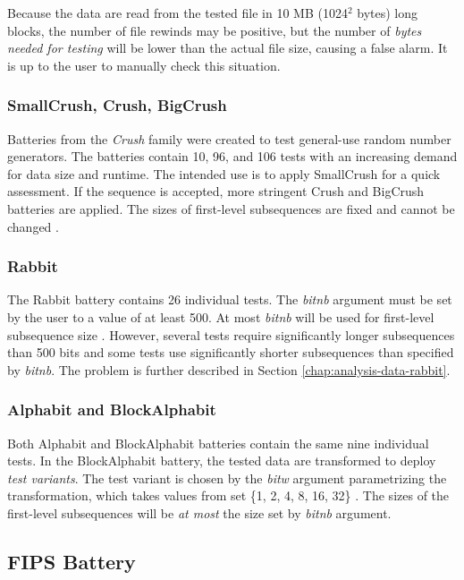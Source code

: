 \documentclass[
  digital,     %
  oneside,     %
  nosansbold,  %
  nocolorbold, %
  nolof,         %
  nolot,         %
]{fithesis4}
\begin{document}
Because the data are read from the tested file in 10 MB (1024$^2$ bytes) long blocks, the number of file rewinds may be positive, but the number of \emph{bytes needed for testing} will be lower than the actual file size, causing a false alarm. It is up to the user to manually check this situation. 


\subsubsection{SmallCrush, Crush, BigCrush}
Batteries from the \emph{Crush} family were created to test general-use random number generators. The batteries contain 10, 96, and 106 tests with an increasing demand for data size and runtime. The intended use is to apply SmallCrush for a quick assessment. If the sequence is accepted, more stringent Crush and BigCrush batteries are applied. The sizes of first-level subsequences are fixed and cannot be changed \cite[p. 242]{tu01_guide}.

\subsubsection{Rabbit}
The Rabbit battery contains 26 individual tests. The \emph{bit\textunderscore nb} argument must be set by the user to a value of at least 500. At most \emph{bit\textunderscore nb} will be used for first-level subsequence size \cite[p. 152]{tu01_guide}. However, several tests require significantly longer subsequences than 500 bits and some tests use significantly shorter subsequences than specified by \emph{bit\textunderscore nb}. The problem is further described in Section \ref{chap:analysis-data-rabbit}.

\subsubsection{Alphabit and BlockAlphabit}
Both Alphabit and BlockAlphabit batteries contain the same nine individual tests. In the BlockAlphabit battery, the tested data are transformed to deploy \emph{test variants}. The test variant is chosen by the \emph{bit\textunderscore w} argument parametrizing the transformation, which takes values from set \{1, 2, 4, 8, 16, 32\} \cite[p. 155]{tu01_guide}. The sizes of the first-level subsequences will be \emph{at most} the size set by \emph{bit\textunderscore nb} argument.


\subsection{FIPS Battery} \label{chap:sols-fips}
\end{document}
